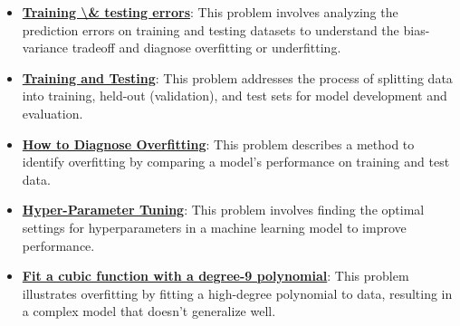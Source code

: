 \documentclass{article}%
\begin{document}
\begin{itemize}[leftmargin=*]
\item \href{https://purdue.brightspace.com/d2l/common/assets/pdfjs-d2l-dist/1.0.14-legacy/web/viewer.html?file=\%2Fcontent\%2Fenforced\%2F1095467-wl.202510.CS.24300.001\%2F10L1-CrossValidation.pdf\%3Fou\%3D1095467\&lang=en-us\&container=d2l-fileviewer-rendered-pdf\&fullscreen=d2l-fileviewer-rendered-pdf-dialog\&height=667#page=4}{\textbf{Training \textbackslash{}& testing errors}}: This problem involves analyzing the prediction errors on training and testing datasets to understand the bias-variance tradeoff and diagnose overfitting or underfitting.%
\item \href{https://purdue.brightspace.com/d2l/common/assets/pdfjs-d2l-dist/1.0.14-legacy/web/viewer.html?file=\%2Fcontent\%2Fenforced\%2F1095467-wl.202510.CS.24300.001\%2F10L1-CrossValidation.pdf\%3Fou\%3D1095467\&lang=en-us\&container=d2l-fileviewer-rendered-pdf\&fullscreen=d2l-fileviewer-rendered-pdf-dialog\&height=667#page=5}{\textbf{Training and Testing}}: This problem addresses the process of splitting data into training, held-out (validation), and test sets for model development and evaluation.%
\item \href{https://purdue.brightspace.com/d2l/common/assets/pdfjs-d2l-dist/1.0.14-legacy/web/viewer.html?file=\%2Fcontent\%2Fenforced\%2F1095467-wl.202510.CS.24300.001\%2F10L1-CrossValidation.pdf\%3Fou\%3D1095467\&lang=en-us\&container=d2l-fileviewer-rendered-pdf\&fullscreen=d2l-fileviewer-rendered-pdf-dialog\&height=667#page=12}{\textbf{How to Diagnose Overfitting}}: This problem describes a method to identify overfitting by comparing a model's performance on training and test data.%
\item \href{https://purdue.brightspace.com/d2l/common/assets/pdfjs-d2l-dist/1.0.14-legacy/web/viewer.html?file=\%2Fcontent\%2Fenforced\%2F1095467-wl.202510.CS.24300.001\%2F10L1-CrossValidation.pdf\%3Fou\%3D1095467\&lang=en-us\&container=d2l-fileviewer-rendered-pdf\&fullscreen=d2l-fileviewer-rendered-pdf-dialog\&height=667#page=14}{\textbf{Hyper-Parameter Tuning}}: This problem involves finding the optimal settings for hyperparameters in a machine learning model to improve performance.%
\item \href{https://purdue.brightspace.com/d2l/common/assets/pdfjs-d2l-dist/1.0.14-legacy/web/viewer.html?file=\%2Fcontent\%2Fenforced\%2F1095467-wl.202510.CS.24300.001\%2F10L1-CrossValidation.pdf\%3Fou\%3D1095467\&lang=en-us\&container=d2l-fileviewer-rendered-pdf\&fullscreen=d2l-fileviewer-rendered-pdf-dialog\&height=667#page=15}{\textbf{Fit a cubic function with a degree-9 polynomial}}: This problem illustrates overfitting by fitting a high-degree polynomial to data, resulting in a complex model that doesn't generalize well.%

\end{itemize}
\end{document}
